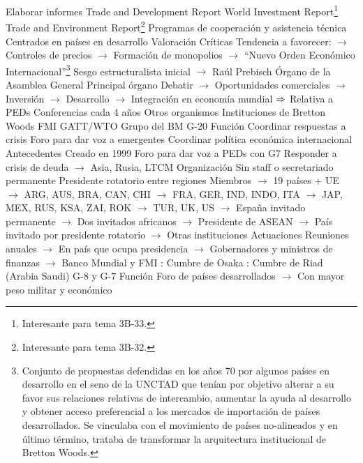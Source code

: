 \documentclass{nuevotema}
\begin{document}
\begin{esquemal}
				\4 Elaborar informes
				\4[] Trade and Development Report
				\4[] World Investment Report\footnote{Interesante para tema 3B-33.}
				\4[] Trade and Environment Report\footnote{Interesante para tema 3B-32.}
				\4 Programas de cooperación y asistencia técnica
				\4[] Centrados en países en desarrollo
			\3 Valoración
				\4 Críticas
				\4[] Tendencia a favorecer:
				\4[] $\to$ Controles de precios
				\4[] $\to$ Formación de monopolios
				\4[] $\to$ ``Nuevo Orden Económico Internacional''\footnote{Conjunto de propuestas defendidas en los años 70 por algunos países en desarrollo en el seno de la UNCTAD que tenían por objetivo alterar a su favor sus relaciones relativas de intercambio, aumentar la ayuda al desarrollo y obtener acceso preferencial a los mercados de importación de países desarrollados. Se vinculaba con el movimiento de países no-alineados y en último término, trataba de transformar la arquitectura institucional de Bretton Woods.}
				\4[] Sesgo estructuralista inicial
				\4[] $\to$ Raúl Prebisch
				\4 Órgano de la Asamblea General
				\4[] Principal órgano
				\4[] Debatir
				\4[] $\to$ Oportunidades comerciales
				\4[] $\to$ Inversión
				\4[] $\to$ Desarrollo
				\4[] $\to$ Integración en economía mundial
				\4[] $\Rightarrow$ Relativa a PEDs
				\4 Conferencias cada 4 años
		\2 Otros organismos
			\3 Instituciones de Bretton Woods
				\4 FMI
				\4 GATT/WTO
				\4 Grupo del BM
			\3 G-20
				\4 Función
				\4[] Coordinar respuestas a crisis
				\4[] Foro para dar voz a emergentes
				\4[] Coordinar política económica internacional
				\4 Antecedentes
				\4[] Creado en 1999
				\4[] Foro para dar voz a PEDs con G7
				\4[] Responder a crisis de deuda
				\4[] $\to$ Asia, Rusia, LTCM
				\4 Organización
				\4[] Sin staff o secretariado permanente
				\4[] Presidente rotatorio entre regiones
				\4[] Miembros
				\4[] $\to$ 19 países + UE
				\4[] $\to$ ARG, AUS, BRA, CAN, CHI
				\4[] $\to$ FRA, GER, IND, INDO, ITA
				\4[] $\to$ JAP, MEX, RUS, KSA, ZAI, ROK
				\4[] $\to$ TUR, UK, US
				\4[] $\to$ España invitado permanente
				\4[] $\to$ Dos invitados africanos
				\4[] $\to$ Presidente de ASEAN
				\4[] $\to$ País invitado por presidente rotatorio
				\4[] $\to$ Otras instituciones
				\4 Actuaciones
				\4[] Reuniones anuales
				\4[] $\to$ En país que ocupa presidencia
				\4[] $\to$ Gobernadores y ministros de finanzas
				\4[] $\to$ Banco Mundial y FMI
				: Cumbre de Osaka
				: Cumbre de Riad (Arabia Saudi)
			\3 G-8 y G-7
				\4 Función
				\4[] Foro de países desarrollados
				\4[] $\to$ Con mayor peso militar y económico

\end{esquemal}
\end{document}
